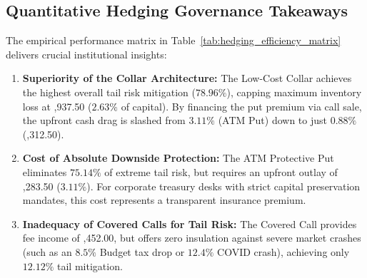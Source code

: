 \subsection{Quantitative Hedging Governance Takeaways}

The empirical performance matrix in Table~\ref{tab:hedging_efficiency_matrix} delivers crucial institutional insights:
\begin{enumerate}[leftmargin=1.5em, itemsep=1.5pt, parsep=0pt, label=(\roman*)]
    \item \textbf{Superiority of the Collar Architecture:} The Low-Cost Collar achieves the highest overall tail risk mitigation ($\mathbf{78.96\%}$), capping maximum inventory loss at ,937.50 ($2.63\%$ of capital). By financing the put premium via call sale, the upfront cash drag is slashed from $3.11\%$ (ATM Put) down to just $\mathbf{0.88\%}$ (,312.50).
    \item \textbf{Cost of Absolute Downside Protection:} The ATM Protective Put eliminates $75.14\%$ of extreme tail risk, but requires an upfront outlay of ,283.50 ($3.11\%$). For corporate treasury desks with strict capital preservation mandates, this cost represents a transparent insurance premium.
    \item \textbf{Inadequacy of Covered Calls for Tail Risk:} The Covered Call provides fee income of ,452.00, but offers zero insulation against severe market crashes (such as an $8.5\%$ Budget tax drop or $12.4\%$ COVID crash), achieving only $12.12\%$ tail mitigation.
\end{enumerate}

\clearpage
